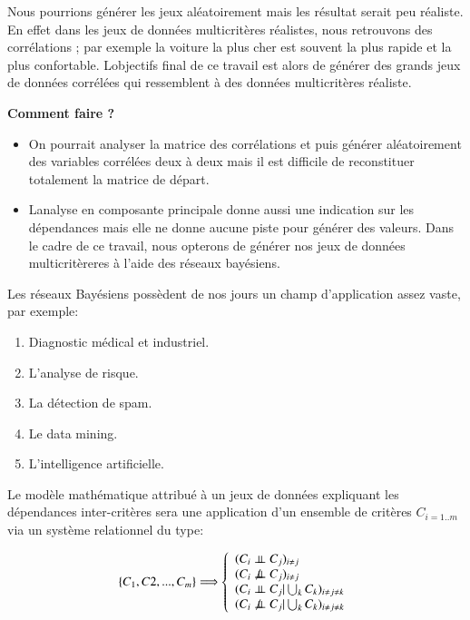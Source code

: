 \documentclass[a4paper]{article}
\begin{document}
Nous pourrions générer les jeux aléatoirement mais les résultat serait peu réaliste. En effet dans les jeux de données multicritères réalistes, nous retrouvons des corrélations ; par exemple la voiture la plus cher est souvent la plus rapide et  la plus confortable.
L\textquotesingle objectifs final de ce travail est alors de générer des grands jeux de données corrélées qui ressemblent à des données multicritères réaliste.




\textbf{Comment faire ?}

\begin{itemize}
\item On pourrait analyser la matrice des corrélations et puis générer aléatoirement des variables corrélées deux à deux  mais il est difficile de reconstituer  totalement la matrice de départ.


\item L\textquotesingle analyse en composante principale donne aussi une indication sur les dépendances mais elle  ne donne aucune piste pour générer des valeurs.
Dans le cadre de ce travail, nous opterons de générer nos jeux de données multicritèreres à l'aide des réseaux bayésiens.

\end{itemize}
Les réseaux Bayésiens possèdent de nos jours  un champ d'application assez vaste, par exemple:

\begin{enumerate}
  \item Diagnostic médical et industriel.
  \item L'analyse de risque.
  \item La détection de spam.
  \item Le data mining.
  \item L'intelligence artificielle.
\end{enumerate}




\newpage
Le modèle mathématique attribué à un jeux de données expliquant les dépendances inter-critères  sera une application d'un ensemble de critères $C_{i=1..m}$ via un système relationnel du type:

\[
\{C_{1},C{2},...,C_{m}\}\Longrightarrow\left\lbrace 
\begin{array}{lcl} 
(C_{i}\ci C_{j})_{i\neq j}\\
  (C_{i} \not\ci C_{j})_{i\neq j}\\
(C_{i}\ci C_{j}|\bigcup_{k} C_{k})_{i\neq j \neq k}\\  
(C_{i}\not\ci C_{j}|\bigcup_{k} C_{k})_{i\neq j \neq k}\\  
\end{array}\right.
\]
\end{document}
